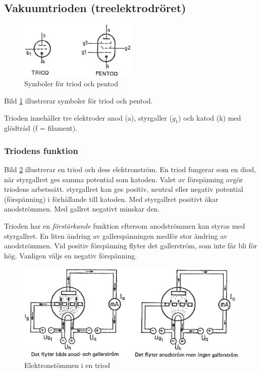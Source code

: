 \subsection{Vakuumtrioden (treelektrodröret)}

\begin{figure}[h]
\begin{center}
  \includegraphics[width=0.5\textwidth]{images/cropped_pdfs/bild_2_2-30.pdf}
  \caption{Symboler för triod och pentod}
  \label{fig:BildII2-30}
\end{center}
\end{figure}

Bild \ref{fig:BildII2-30} illustrerar symboler för triod och pentod.

Trioden innehåller tre elektroder anod (a), styrgaller (\(g_1\)) och katod (k)
med glödtråd (f = filament).

\subsubsection{Triodens funktion}

Bild \ref{fig:BildII2-31} illustrerar en triod och dess elektronström.
En triod fungerar som en diod, när styrgallret ges samma potential som katoden.
Valet av förspänning avgör triodens arbetssätt. styrgallret kan ges positiv,
neutral eller negativ potential (förspänning) i förhållande till katoden. Med
styrgallret positivt ökar anodströmmen. Med gallret negativt minskar den.

Trioden har en \emph{förstärkande} funktion eftersom anodströmmen kan styras med
styrgallret. En liten ändring av gallerspänningen medför stor ändring av
anodströmmen. Vid positiv förspänning flyter det gallerström, som inte får bli
för hög. Vanligen väljs en negativ förspänning.

\begin{figure}[h]
\includegraphics[width=\textwidth]{images/cropped_pdfs/bild_2_2-31.pdf}
\caption{Elektronstömmen i en triod}
\label{fig:BildII2-31}
\end{figure}


